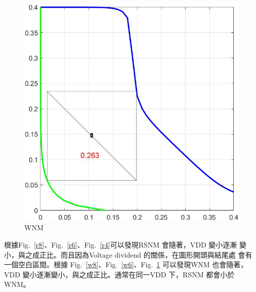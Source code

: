 \documentclass{article}
\begin{document}
\begin{figure}[H]
\begin{minipage}[t]{0.45\textwidth}
          \includegraphics[width=\linewidth]{./img/2024-01-11-23-32-16.png}
      \caption{WNM}
      \label{w4}
      \end{minipage}
      \end{figure}

      根據Fig.~\ref{r8}、Fig.~\ref{r6}、Fig.~\ref{r4}可以發現RSNM 會隨著，VDD 變小逐漸
      變小，與之成正比。而且因為Voltage dividend 的關係，在圖形開頭與結尾處
      會有一個空白區間。根據 Fig.~\ref{w8}、Fig.~\ref{w6}、Fig.~\ref{w4} 可以發現WNM 也會隨著，VDD 變小逐漸變小，與之成正比。通常在同一VDD 下，RSNM 都會小於
      WNM。
\end{document}
